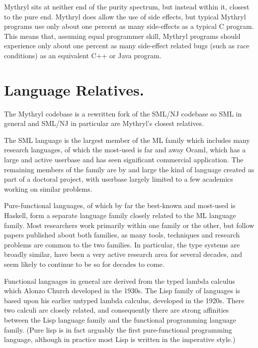Mythryl sits at neither end of the purity spectrum, but instead within it, 
closest to the pure end.  Mythryl does allow the use of side effects, but 
typical Mythryl programs use only about one percent as many side-effects 
as a typical C program.  This means that, assuming equal programmer skill, 
Mythryl programs should experience only about one percent as many side-effect 
related bugs (such as race conditions) as an equivalent C++ or Java program.


\section{Language Relatives.}

The Mythryl codebase is a rewritten fork of the {\sc SML/NJ} codebase so {\sc SML} 
in general and {\sc SML/NJ} in particular are Mythryl's closest relatives.

The {\sc SML} language is the largest member of the {\sc ML} family which includes 
many research languages, of which the most-used is far and away Ocaml, which has 
a large and active userbase and has seen significant commercial application.  The 
remaining members of the family are by and large the kind of language created as 
part of a doctoral project, with userbase largely limited to a few academics 
working on similar problems.

Pure-functional languages, of which by far the best-known and most-used is 
Haskell, form a separate language family closely related to the {\sc ML} 
language family.  Most researchers work primarily within one family or the 
other, but follow papers published about both families, as many tools, 
techniques and research problems are common to the two families.  In particular, 
the type systems are broadly similar, have been a very active research area for 
several decades, and seem likely to continue to be so for decades to come.

Functional languages in general are derived from the typed lambda 
calculus which Alonzo Church developed in the 1930s.  The Lisp 
family of languages is based upon his earlier untyped lambda calculus, 
developed in the 1920s.  There two calculi are closely related, and 
consequently there are strong affinities between the Lisp language 
family and the functional programming language family.  (Pure lisp 
is in fact arguably the first pure-functional programming language, 
although in practice most Lisp is written in the imperative style.)


